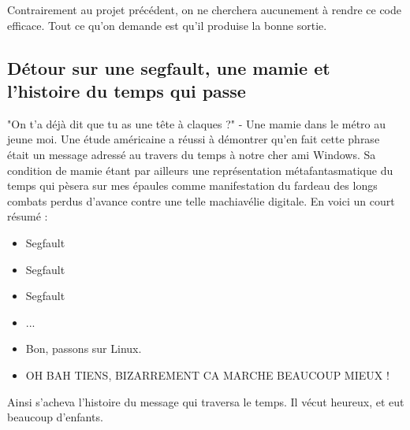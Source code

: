 \documentclass{article}
\begin{document}
Contrairement au projet précédent, on ne cherchera aucunement à rendre ce code efficace. Tout ce qu'on demande est qu'il produise la bonne sortie.

\subsection{Détour sur une segfault, une mamie et l'histoire du temps qui passe}
"On t'a déjà dit que tu as une tête à claques ?" - Une mamie dans le métro au jeune moi. Une étude américaine a réussi à démontrer qu'en fait cette phrase était un message adressé au travers du temps à notre cher ami Windows. Sa condition de mamie étant par ailleurs une représentation métafantasmatique du temps qui pèsera sur mes épaules comme manifestation du fardeau des longs combats perdus d'avance contre une telle machiavélie digitale. En voici un court résumé :\newline
\begin{itemize}
\item Segfault
\item Segfault
\item Segfault
\item ...
\item Bon, passons sur Linux.
\item OH BAH TIENS, BIZARREMENT CA MARCHE BEAUCOUP MIEUX !
\end{itemize}

Ainsi s'acheva l'histoire du message qui traversa le temps. Il vécut heureux, et eut beaucoup d'enfants.
\end{document}
